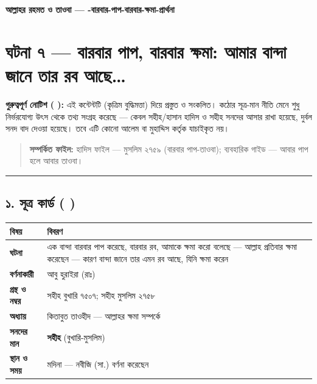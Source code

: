 

\begin{center}{\Large\bfseries\color{emerald} আল্লাহর রহমত ও তাওবা — -বারবার-পাপ-বারবার-ক্ষমা-প্রার্থনা}\end{center}
\vspace{1em}
\section*{ঘটনা ৭ — বারবার পাপ, বারবার ক্ষমা: আমার বান্দা জানে তার রব আছে…}

\begin{warnbox}
 \textbf{গুরুত্বপূর্ণ নোটিশ ( ):} এই কন্টেন্টটি  (কৃত্রিম বুদ্ধিমত্তা) দিয়ে প্রস্তুত ও সংকলিত।  কঠোর সূত্র-মান নীতি মেনে শুধু নির্ভরযোগ্য উৎস থেকে তথ্য সংগ্রহ করেছে — কেবল সহীহ/হাসান হাদিস ও সহীহ সনদের আসার রাখা হয়েছে, দুর্বল সনদ বাদ দেওয়া হয়েছে। তবে এটি কোনো আলেম বা মুহাদ্দিস কর্তৃক যাচাইকৃত নয়।
\end{warnbox}

\begin{quote}
\textbf{সম্পর্কিত ফাইল:} হাদিস ফাইল — মুসলিম ২৭৫৯ (বারবার পাপ-তাওবা); ব্যবহারিক গাইড — আবার পাপ হলে আবার তাওবা।
\end{quote}

\medskip\hrule\medskip

\subsection*{১. সূত্র কার্ড ( )}

\begin{table}[h]\centering\small
\begin{tabular}{ll}
বিষয় & বিবরণ \\
\hline
\textbf{ঘটনা} & এক বান্দা বারবার পাপ করেছে, বারবার \lat{“}রব, আমাকে ক্ষমা করো\lat{”} বলেছে — আল্লাহ প্রতিবার ক্ষমা করেছেন — কারণ বান্দা জানে তার এমন রব আছে, যিনি ক্ষমা করেন \\
\textbf{বর্ণনাকারী} & আবু হুরাইরা (রাঃ) \\
\textbf{গ্রন্থ ও নম্বর} & সহীহ বুখারি ৭৫০৭; সহীহ মুসলিম ২৭৫৮ \\
\textbf{অধ্যায়} & কিতাবুত তাওহীদ — আল্লাহর ক্ষমা সম্পর্কে \\
\textbf{সনদের মান} & \textbf{সহীহ} (বুখারি-মুসলিম) \\
\textbf{স্থান ও সময়} & মদিনা — নবীজি (সা.) বর্ণনা করেছেন \\
\hline
\end{tabular}
\end{table}


